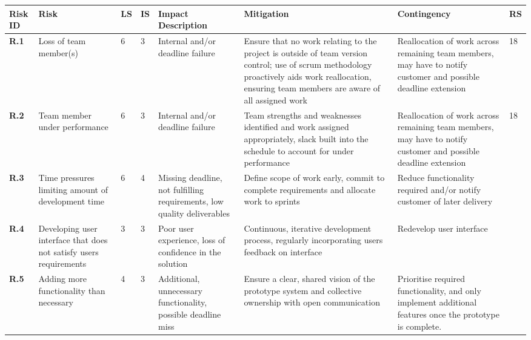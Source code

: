 \begin{longtable}[H]{| p{0.65cm} | p{2cm} | p{0.3cm} | p{0.3cm} | p{2.4cm} | p{3cm} | p{2.7cm} | p{0.4cm} |}
  \hline
  \cellcolor{titleColor}\textbf{Risk ID} &
  \cellcolor{titleColor}\textbf{Risk} &
  \cellcolor{titleColor}\textbf{LS} &
  \cellcolor{titleColor}\textbf{IS} &
  \cellcolor{titleColor}\textbf{Impact Description} &
  \cellcolor{titleColor}\textbf{Mitigation} &
  \cellcolor{titleColor}\textbf{Contingency} &
  \cellcolor{titleColor}\textbf{RS}\\
  
  \hline \textbf{R.1}
  & Loss of team member(s)
  & 6
  & 3
  & Internal and/or deadline failure
  & Ensure that no work relating to the project is outside of team
  version control; use of scrum methodology proactively aids work
  reallocation, ensuring team members are aware of all assigned work
  & Reallocation of work across remaining team members, may have to notify customer and possible deadline extension
  & 18 \\
  
  \hline \textbf{R.2}
  & Team member under performance
  & 6
  & 3
  & Internal and/or deadline failure
  & Team strengths and weaknesses identified and work assigned appropriately, slack built into the schedule to account for under performance
  & Reallocation of work across remaining team members, may have to notify customer and possible deadline extension
  & 18 \\
  
  \hline \textbf{R.3}
  & Time pressures limiting amount of development time
  & 6
  & 4
  & Missing deadline, not fulfilling requirements, low quality deliverables
  & Define scope of work early, commit to complete requirements and allocate work to sprints 
  & Reduce functionality required and/or notify customer of later delivery
  & \\
  
  \hline \textbf{R.4}
  & Developing user interface that does not satisfy users requirements
  & 3
  & 3
  & Poor user experience, loss of confidence in the solution
  & Continuous, iterative development process, regularly incorporating users feedback on interface
  & Redevelop user interface
  & \\
  
  \hline \textbf{R.5}
  & Adding more functionality than necessary
  & 4
  & 3
  & Additional, unnecessary functionality, possible deadline miss
  & Ensure a clear, shared vision of the prototype system and collective ownership with open communication
  & Prioritise required functionality, and only implement additional features once the prototype is complete.
  & \\
  

\end{longtable}
